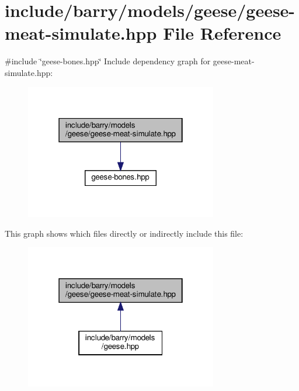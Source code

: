 \hypertarget{geese-meat-simulate_8hpp}{}\section{include/barry/models/geese/geese-\/meat-\/simulate.hpp File Reference}
\label{geese-meat-simulate_8hpp}
{\ttfamily \#include \char`\"{}geese-\/bones.\+hpp\char`\"{}}\newline
Include dependency graph for geese-\/meat-\/simulate.hpp\+:
\nopagebreak
\begin{figure}[H]
\begin{center}
\leavevmode
\includegraphics[width=238pt]{geese-meat-simulate_8hpp__incl}
\end{center}
\end{figure}
This graph shows which files directly or indirectly include this file\+:
\nopagebreak
\begin{figure}[H]
\begin{center}
\leavevmode
\includegraphics[width=238pt]{geese-meat-simulate_8hpp__dep__incl}
\end{center}
\end{figure}
